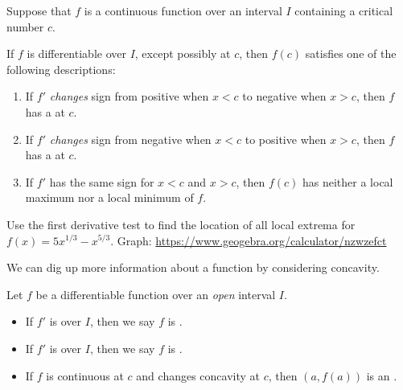 \documentclass[../main.tex]{subfiles}
\begin{document}
\begin{mdframed}[style=withref-compact]
  Suppose that \(f\) is a continuous function over an interval \(I\) containing a critical number \(c\). 

  If \(f\) is differentiable over \(I\), except possibly at \(c\), then \(f(c)\) satisfies one of the following descriptions:
  \begin{enumerate}
    \item If \(f'\) \emph{changes} sign from positive when \(x < c\) to negative when \(x > c\), then \(f\) has a \underline{\hspace{2in}} at \(c\).
    \item If \(f'\) \emph{changes} sign from negative when \(x < c\) to positive when \(x > c\), then \(f\) has a \underline{\hspace{2in}} at \(c\).
    \item If \(f'\) has the same sign for \(x < c\) and \(x > c\), then \(f(c)\) has neither a local maximum nor a local minimum of \(f\).
  \end{enumerate}

\end{mdframed}

\begin{example} \label{ex:first-derivative}
  Use the first derivative test to find the location of all local extrema for \(f(x) = 5x^{1/3} - x^{5/3}\). Graph: \url{https://www.geogebra.org/calculator/nzwzefct}

\end{example}
\clearpage

We can dig up more information about a function by considering concavity.
\begin{mdframed}[style=withref-compact]
  Let \(f\) be a differentiable function over an \emph{open} interval \(I\).
  \begin{itemize}
    \item If \(f'\) is \underline{\hspace{1in}} over \(I\), then we say \(f\) is .
    \item If \(f'\) is \underline{\hspace{1in}} over \(I\), then we say \(f\) is .
    \item If \(f\) is continuous at \(c\) and changes concavity at \(c\), then \((a,f(a))\) is an . 
  \end{itemize}

\end{mdframed}
\end{document}
